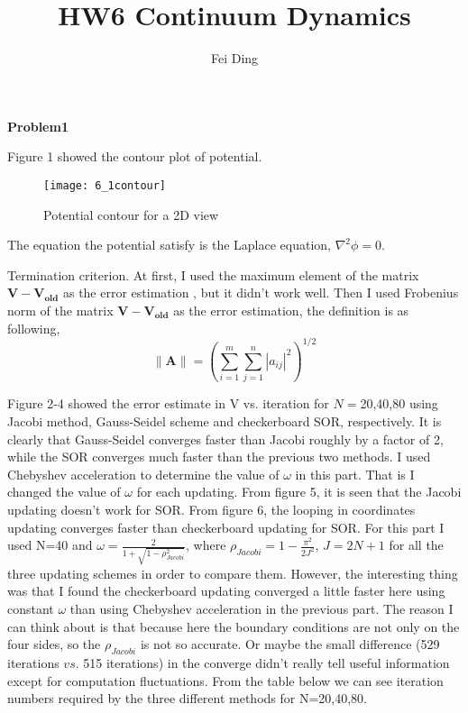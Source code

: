 \documentclass{article}
\title{HW6 Continuum Dynamics}
\author{Fei Ding}
\begin{document}
\maketitle

\textbf{Problem1}

Figure 1 showed the contour plot of potential.

\begin{figure} [ht]
\texttt{[image: 6\_1contour]}
\caption{Potential contour for a 2D view}
\end{figure}

The equation the potential satisfy is the Laplace equation, $\nabla^2 \phi = 0$.

Termination criterion.  At first, I used the maximum element of the matrix $\mathbf{V-V_{old}}$ as the error estimation , but it didn't work well.  Then I used Frobenius norm of the matrix $\mathbf{V-V_{old}}$ as the error estimation, the definition is as following,
\[\| \mathbf{A} \| = \left( \sum_{i=1}^m \sum_{j=1}^n \left|a_{ij}\right|^2 \right)^{1/2}\]

Figure 2-4 showed the error estimate in V vs. iteration for $N=$20,40,80 using Jacobi method, Gauss-Seidel scheme and checkerboard SOR, respectively.  It is clearly that Gauss-Seidel converges faster than Jacobi roughly by a factor of 2, while the SOR converges much faster than the previous two methods.   I used Chebyshev acceleration to determine the value of $\omega$ in this part.  That is I changed the value of $\omega$ for each updating.
\vskip 0.5cm
From figure 5, it is seen that the Jacobi updating doesn't work for SOR.  From figure 6, the looping in coordinates updating converges faster than checkerboard updating for SOR.  For this part I used N=40 and $\omega=\frac{2}{1+\sqrt{1-\rho_{Jacobi}^2}}$, where $\rho_{Jacobi}=1-\frac{\pi^2}{2J^2}$, $J=2N+1$ for all the three updating schemes in order to compare them.  However, the interesting thing was that I found the checkerboard updating converged a little faster here using constant $\omega$ than using Chebyshev acceleration in the previous part.  The reason I can think about is that because here the boundary conditions are not only on the four sides, so the $\rho_{Jacobi}$ is not so accurate.  Or maybe the small difference (529 iterations $vs.$ 515 iterations) in the converge didn't really tell useful information except for computation fluctuations.
\vskip0.5cm
From the table below we can see iteration numbers required by the three different methods for N=20,40,80.
\end{document}
